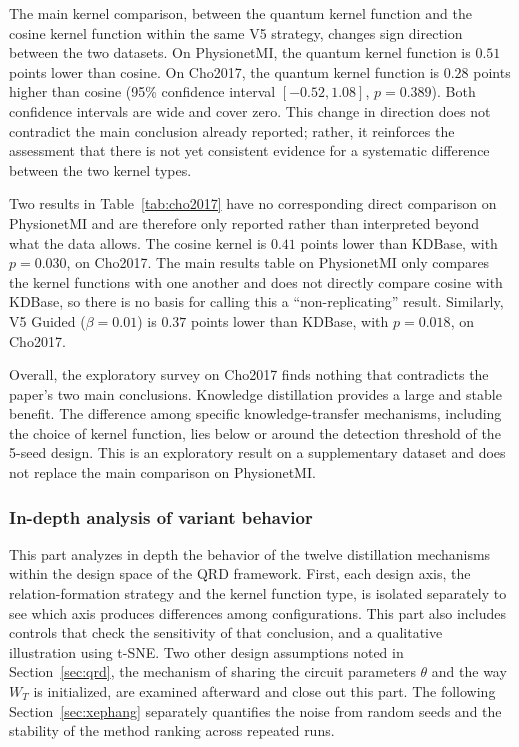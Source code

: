 The main kernel comparison, between the quantum kernel function and
the cosine kernel function within the same V5 strategy, changes sign
direction between the two datasets. On PhysionetMI, the quantum
kernel function is $0.51$ points lower than cosine. On Cho2017, the
quantum kernel function is $0.28$ points higher than cosine (95\%
confidence interval $[-0.52, 1.08]$, $p = 0.389$). Both confidence
intervals are wide and cover zero. This change in direction does not
contradict the main conclusion already reported; rather, it
reinforces the assessment that there is not yet consistent evidence
for a systematic difference between the two kernel types.

Two results in Table~\ref{tab:cho2017} have no corresponding direct
comparison on PhysionetMI and are therefore only reported rather
than interpreted beyond what the data allows. The cosine kernel is
$0.41$ points lower than KDBase, with $p = 0.030$, on Cho2017. The
main results table on PhysionetMI only compares the kernel functions
with one another and does not directly compare cosine with KDBase,
so there is no basis for calling this a ``non-replicating'' result.
Similarly, V5 Guided ($\beta = 0.01$) is $0.37$ points lower than
KDBase, with $p = 0.018$, on Cho2017.

Overall, the exploratory survey on Cho2017 finds nothing that
contradicts the paper's two main conclusions. Knowledge distillation
provides a large and stable benefit. The difference among specific
knowledge-transfer mechanisms, including the choice of kernel
function, lies below or around the detection threshold of the
5-seed design. This is an exploratory result on a supplementary
dataset and does not replace the main comparison on PhysionetMI.

\subsubsection{In-depth analysis of variant behavior}
\label{sec:chuyensau}

This part analyzes in depth the behavior of the twelve distillation
mechanisms within the design space of the QRD framework. First, each
design axis, the relation-formation strategy and the kernel function
type, is isolated separately to see which axis produces differences
among configurations. This part also includes controls that check
the sensitivity of that conclusion, and a qualitative illustration
using t-SNE. Two other design assumptions noted in
Section~\ref{sec:qrd}, the mechanism of sharing the circuit
parameters $\theta$ and the way $W_T$ is initialized, are examined
afterward and close out this part. The following
Section~\ref{sec:xephang} separately quantifies the noise from
random seeds and the stability of the method ranking across repeated
runs.

